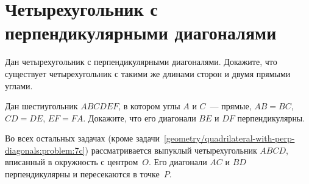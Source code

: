 
\section*{Четырехугольник с перпендикулярными диагоналями}


\begin{problems}

\item
Дан четырехугольник с перпендикулярными диагоналями.
Докажите, что существует четырехугольник с такими же длинами сторон и двумя
прямыми углами.

\item
Дан шестиугольник $ABCDEF$, в котором углы $A$ и $C$~--- прямые,
$AB = BC$, $CD = DE$, $EF = FA$.
Докажите, что его диагонали $BE$ и $DF$ перпендикулярны.

\end{problems}

Во всех остальных задачах
(кроме задачи~\ref{geometry/quadrilateral-with-perp-diagonals:problem:7c})
рассматривается выпуклый четырехугольник $ABCD$, вписанный в окружность
с центром~$O$.
Его диагонали $AC$ и $BD$ перпендикулярны и пересекаются в точке~$P$.

